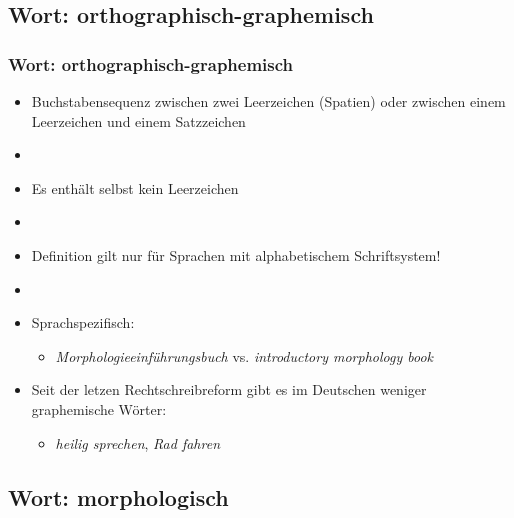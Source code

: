 \subsection{Wort: orthographisch-graphemisch}


\begin{frame}
\frametitle{Wort: orthographisch-graphemisch}

\begin{itemize}
	\item Buchstabensequenz zwischen zwei Leerzeichen (Spatien) oder
zwischen einem Leerzeichen und einem Satzzeichen
	\item[]
	\item Es enthält selbst kein Leerzeichen
	\item[]
	\item Definition gilt nur für Sprachen mit alphabetischem Schriftsystem!
	\item[]
	\item Sprachspezifisch:
	
	\begin{itemize}
		\item \emph{Morphologieeinführungsbuch} vs. \emph{introductory morphology book}
	\end{itemize}
	
	\item Seit der letzen Rechtschreibreform gibt es im Deutschen weniger
graphemische Wörter:
	
	\begin{itemize}
		\item \emph{heilig sprechen}, \emph{Rad fahren}
	\end{itemize}
\end{itemize}


\end{frame}


\subsection{Wort: morphologisch}


